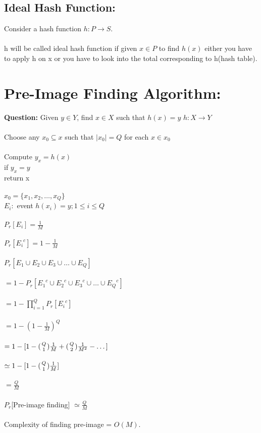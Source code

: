\documentclass[11pt]{article}
\begin{document}
\subsection*{Ideal Hash Function:}
Consider a hash function $h: P \to S$.\\\\
h will be called ideal hash function if given $x \in P$ to find $h(x)$ either you have to apply h on x or you have to look into the total corresponding to h(hash table).
\section*{Pre-Image Finding Algorithm:}
\textbf{Question:} Given $y \in Y$, find $x \in X$ such that $h(x) = y$
$h: X \to Y$\\\\
Choose any $x_0 \subseteq x$ such that $|x_0| = Q$ for each $x \in x_0$\\\\
Compute $y_x = h(x)$\\
if $y_x = y$\\
return x\\\\
$x_0 = \{ x_1, x_2, \dots, x_Q \}$\\
$E_i:$ event $h(x_i) = y; 1 \le i \le Q$\\\\
$P_r[E_i] = \frac{1}{M}$\\\\
$P_r[{E_i}^c] = 1 - \frac{1}{M}$\\\\
$P_r[E_1 \cup E_2 \cup E_3 \cup \dots \cup E_Q]$\\\\
$= 1 - P_r[{E_1}^c \cup {E_2}^c \cup {E_3}^c \cup \dots \cup {E_Q}^c]$\\\\
$= 1 - \prod_{i = 1}^{Q} P_r[{E_i}^c]$\\\\
$= 1 - {(1- \frac{1}{M})}^Q$\\\\
$= 1 - [1 - ({Q \atop 1})\frac{1}{M} + ({Q \atop 2})\frac{1}{M^2} - \dots]$\\\\
$\simeq 1 - [1 - ({Q \atop 1})\frac{1}{M}]$\\\\
$= \frac{Q}{M}$\\\\
$P_r$[Pre-image finding] $\simeq \frac{Q}{M}$\\\\
Complexity of finding pre-image = $O(M)$.
\end{document}
